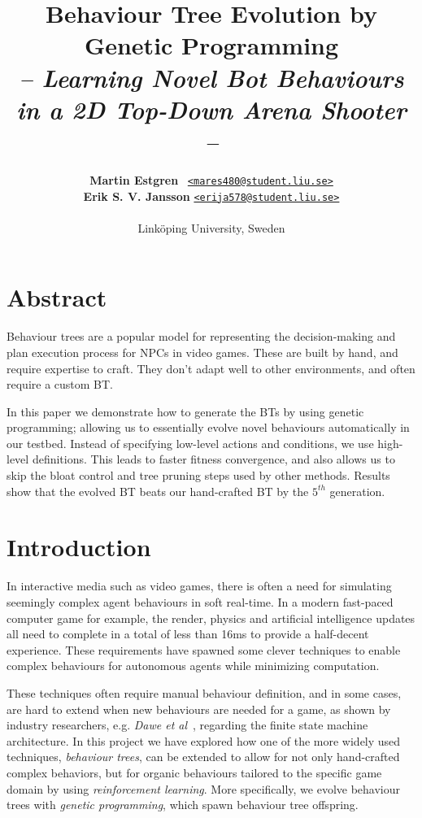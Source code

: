 \documentclass[a4paper, twocolumn]{article}
\title{\textbf{Behaviour Tree Evolution by Genetic Programming}\\
       \Large{\emph{-- Learning Novel Bot Behaviours in a 2D Top-Down Arena Shooter --}}}
\author{{\textbf{Martin Estgren}} \;\;\;\;\;\;\;\;\;\, {\href{mailto:mares480@student.liu.se}
                                                       {\texttt{<mares480@student.liu.se>}}} \\
        {\textbf{Erik S. V. Jansson}} \;\;\;\;         {\href{mailto:erija578@student.liu.se}
                                                       {\texttt{<erija578@student.liu.se>}}} \\~\\
        {Linköping University, Sweden}\vspace{-2.0ex}}
\begin{document}
    \maketitle
    \section*{Abstract}

    Behaviour trees are a popular model for representing the decision-making and plan execution process for NPCs in video games. These are built by hand, and require expertise to craft. They don't adapt well to other environments, and often require a custom BT.

    In this paper we demonstrate how to generate the BTs by using genetic programming; allowing us to essentially evolve novel behaviours automatically in our testbed. Instead of specifying low-level actions and conditions, we use high-level definitions. This leads to faster fitness convergence, and also allows us to skip the bloat control and tree pruning steps used by other methods. Results show that the evolved BT beats our hand-crafted BT by the \(5^{th}\) generation. \footnotemark[1]

    \vspace{1.0em}

    \begingroup
    \def\addvspace#1{}
    \tableofcontents
    \endgroup
    \newpage

    \newpage %
    \nocite{*} %
    
    
    \clearpage

    \section{Introduction} \label{sec:introduction}

    In interactive media such as video games, there is often a need for simulating seemingly complex agent behaviours in soft real-time. In a modern fast-paced computer game for example, the render, physics and artificial intelligence updates all need to complete in a total of less than 16ms to provide a half-decent experience. These requirements have spawned some clever techniques to enable complex behaviours for autonomous agents while minimizing computation.

    These techniques often require manual behaviour definition, and in some cases, are hard to extend when new behaviours are needed for a game, as shown by industry researchers, e.g. \emph{Dawe et al}~\cite{dawe2014overview}, regarding the finite state machine architecture. In this project we have explored how one of the more widely used techniques, \emph{behaviour trees}, can be extended to allow for not only hand-crafted complex behaviors, but for organic behaviours tailored to the specific game domain by using \emph{reinforcement learning}. More specifically, we evolve behaviour trees with \emph{genetic programming}, which spawn behaviour tree offspring.
\end{document}
